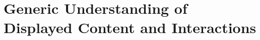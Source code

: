 \chapter{Generic Understanding of Displayed Content and Interactions}\label{chap:muifold}










